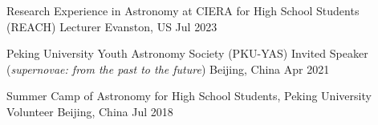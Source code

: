 \begin{cventries}

\cventry
{Research Experience in Astronomy at CIERA for High School Students (REACH)}
{Lecturer}
{Evanston, US}
{Jul 2023}
{}

\cventry
{Peking University Youth Astronomy Society (PKU-YAS)}
{Invited Speaker (\textit{supernovae: from the past to the future})}
{Beijing, China}
{Apr 2021}
{}


\cventry
{Summer Camp of Astronomy for High School Students, Peking University} %
{Volunteer} %
{Beijing, China} %
{Jul 2018} %
{ %
}




{ %
}

\end{cventries}